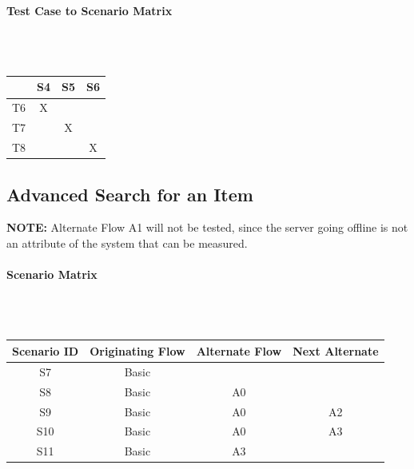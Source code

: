 \documentclass{article}
\begin{document}
\paragraph{Test Case to Scenario Matrix}~\\ \\
\begin{tabular}{ | c || c | c | c | }
\hline
   & S4 & S5 & S6 \\
\hline
\hline
T6 & X  &    &    \\
\hline
T7 &    & X  &    \\
\hline
T8 &    &    & X  \\
\hline
\end{tabular}


\subsection{Advanced Search for an Item}
\textbf{NOTE:} Alternate Flow A1 will not be tested, since the server going offline is not an attribute of the system that can be measured.

\paragraph{Scenario Matrix}~\\ \\
\begin{tabular}{ c  c  c  c }
\hline
Scenario ID & Originating Flow & Alternate Flow & Next Alternate \\
\hline
\hline
S7 & Basic &  & \\
\hline
S8 & Basic & A0 & \\
\hline
S9 & Basic & A0 & A2 \\
\hline
S10 & Basic & A0 & A3 \\
\hline
S11 & Basic & A3 &  \\
\hline
\end{tabular}\\
~\\
~\\
\end{document}
